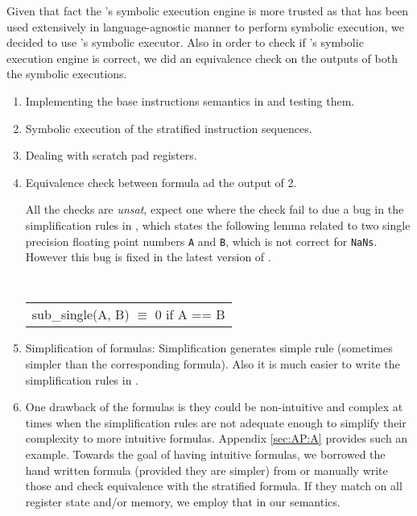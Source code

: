 Given that fact the \K's symbolic execution engine is more trusted as 
that has been used extensively in language-agnostic manner to perform symbolic
execution, we decided to use \K's symbolic executor. Also in order to check 
if \Strata's symbolic execution engine is correct, we did an equivalence check on 
the outputs of both the symbolic executions.   
 

\begin{enumerate}
\item Implementing the base instructions semantics in \K and testing them.
\item Symbolic execution of the stratified instruction sequences.
\item Dealing with scratch pad registers.
\item Equivalence check between \Strata formula ad the output of 2.
   
   All the checks are \emph{unsat}, expect one where the check fail to due a bug in the simplification
   rules in \Strata, which states the following lemma related to two single precision floating point numbers  {\tt A}  and {\tt B}, which is not correct for {\tt NaNs}. However this bug is fixed in 
   the latest version of \Stoke. 
   
   
   { \tt  
        \begin{tabular}[b]{l}
   \qquad sub\_single(A, B) $\equiv$ 0 if A == B     
      \end{tabular}
  }
   
\item {Simplification of formulas:}
  Simplification generates simple \K rule (sometimes simpler than the corresponding \Strata formula).
 Also it is much easier to write the simplification rules in
  \K.


\item One drawback of the \Strata formulas is they could be non-intuitive and complex at times when the simplification rules are not adequate enough to simplify their complexity to more intuitive formulas. Appendix \ref{sec:AP:A} provides such an example.
Towards the goal of having intuitive formulas, we borrowed the hand written formula (provided they are simpler) from \Stoke or manually write those  and check equivalence with the stratified formula. If they match on all register state and/or memory, we employ that in our \K semantics.


       


\end{enumerate}

